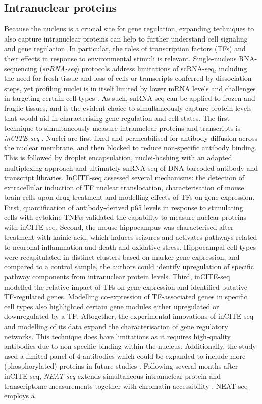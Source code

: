 \documentclass[times, twoside, watermark]{zHenriquesLab-StyleBioRxiv}
\begin{document}
\subsection*{Intranuclear proteins} Because the nucleus is a crucial site for gene regulation, expanding techniques to also capture intranuclear proteins can help to further understand cell signaling and gene regulation. In particular, the roles of transcription factors (TFs) and their effects in response to environmental stimuli is relevant. Single-nucleus RNA-sequencing (\textit{snRNA-seq}) protocols address limitations of scRNA-seq, including the need for fresh tissue and loss of cells or transcripts conferred by dissociation steps, yet profiling nuclei is in itself limited by lower mRNA levels and challenges in targeting certain cell types \cite{Slyper2020}. As such, snRNA-seq can be applied to frozen and fragile tissues, and is the evident choice to simultaneously capture protein levels that would aid in characterising gene regulation and cell states. \newline The first technique to simultaneously measure intranuclear proteins and transcripts is \textit{inCITE-seq} \cite{Chung2021}. Nuclei are first fixed and permeabilised for antibody diffusion across the nuclear membrane, and then blocked to reduce non-specific antibody binding. This is followed by droplet encapsulation, nuclei-hashing with an adapted multiplexing approach \cite{Gaublomme2019} and ultimately snRNA-seq of DNA-barcoded antibody and transcript libraries. InCITE-seq assessed several mechanisms: the detection of extracellular induction of TF nuclear translocation, characterisation of mouse brain cells upon drug treatment and modelling effects of TFs on gene expression. First, quantification of antibody-derived p65 levels in response to stimulating cells with cytokine TNF$\alpha$ validated the capability to measure nuclear proteins with inCITE-seq. Second, the mouse hippocampus was characterised after treatment with kainic acid, which induces seizures and activates pathways related to neuronal inflammation and death and oxidative stress. Hippocampal cell types were recapitulated in distinct clusters based on marker gene expression, and compared to a control sample, the authors could identify upregulation of specific pathway components from intranuclear protein levels. Third, inCITE-seq modelled the relative impact of TFs on gene expression and identified putative TF-regulated genes. Modelling co-expression of TF-associated genes in specific cell types also highlighted certain gene modules either upregulated or downregulated by a TF. Altogether, the experimental innovations of inCITE-seq and modelling of its data expand the characterisation of gene regulatory networks. This technique does have limitations as it requires high-quality antibodies due to non-specific binding within the nucleus. Additionally, the study used a limited panel of 4 antibodies which could be expanded to include more (phosphorylated) proteins in future studies \cite{Chung2021}. \newline Following several months after inCITE-seq, \textit{NEAT-seq} extends simultaneous intranuclear protein and transcriptome measurements together with chromatin accessibility \cite{Chen2021}. NEAT-seq employs a 
\end{document}
